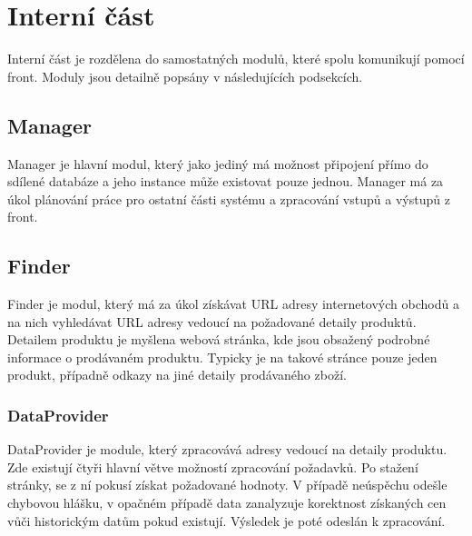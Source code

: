 \documentclass[thesis=B,czech]{FITthesis}[2012/06/26]
\begin{document}
\section{Interní část}
Interní část je rozdělena do samostatných modulů, které spolu komunikují pomocí front. Moduly jsou detailně popsány v následujících podsekcích.
\subsection{Manager}
Manager je hlavní modul, který jako jediný má možnost připojení přímo do sdílené databáze a jeho instance může existovat pouze jednou.
Manager má za úkol plánování práce pro ostatní části systému a zpracování vstupů a výstupů z front.
\subsection{Finder}
Finder je modul, který má za úkol získávat URL adresy internetových obchodů a na nich vyhledávat URL adresy vedoucí na požadované detaily produktů.
Detailem produktu je myšlena webová stránka, kde jsou obsažený podrobné informace o prodávaném produktu. Typicky je na takové stránce pouze jeden
produkt, případně odkazy na jiné detaily prodávaného zboží.
\subsubsection{DataProvider}
DataProvider je module, který zpracovává adresy vedoucí na detaily produktu. Zde existují čtyři hlavní větve možností zpracování požadavků.
Po stažení stránky, se z ní pokusí získat požadované
hodnoty. V případě neúspěchu odešle chybovou hlášku, v opačném případě data zanalyzuje korektnost získaných cen vůči historickým datům pokud
existují. Výsledek je poté odeslán k zpracování.  
\end{document}
